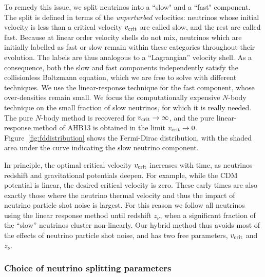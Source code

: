\documentclass[useAMS, usenatbib]{mnras}
\begin{document}
To remedy this issue, we split neutrinos into a ``slow" and a ``fast" component. The split is defined in terms of the \emph{unperturbed} velocities: neutrinos whose initial velocity is less than a critical velocity $v_{\rm crit}$ are called slow, and the rest are called fast. Because at linear order velocity shells do not mix, neutrinos which are initially labelled as fast or slow remain within these categories throughout their evolution. The labels are thus analogous to a ``Lagrangian'' velocity shell. As a consequence, both the slow and fast components independently satisfy the collisionless Boltzmann equation, which we are free to solve with different techniques. We use the linear-response technique for the fast component, whose over-densities remain small. We focus the computationally expensive $N$-body technique on the small fraction of slow neutrinos, for which it is really needed. The pure $N$-body method is recovered for $v_{\rm crit} \rightarrow \infty$, and the pure linear-response method of AHB13 is obtained in the limit $v_{\rm crit} \rightarrow 0$. Figure~\ref{fig:fddistribution} shows the Fermi-Dirac distribution, with the shaded area under the curve indicating the slow neutrino component.

In principle, the optimal critical velocity $v_{\rm crit}$ increases with time, as neutrinos redshift and gravitational potentials deepen. For example, while the CDM potential is linear, the desired critical velocity is zero. These early times are also exactly those where the neutrino thermal velocity and thus the impact of neutrino particle shot noise is largest. For this reason we follow all neutrinos using the linear response method until redshift $z_{\nu}$, when a significant fraction of the ``slow'' neutrinos cluster non-linearly. Our hybrid method thus avoids most of the effects of neutrino particle shot noise, and has two free parameters, $v_{\rm crit}$ and $z_{\nu}$.

\subsubsection{Choice of neutrino splitting parameters}
\label{sec:parameters}
\end{document}
